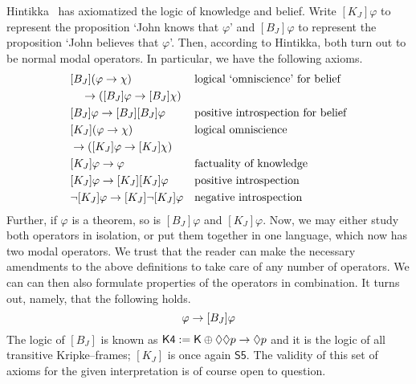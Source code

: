 \index{$[K_J]$, $[B_J]$}%
Hintikka~ has axiomatized the logic
of knowledge and belief. Write $[K_J]\varphi$ to represent
the proposition `John knows that $\varphi$' and $[B_J]\varphi$
to represent the proposition `John believes that $\varphi$'.
Then, according to Hintikka, both turn out to be normal modal
operators. In particular, we have the following axioms.
\begin{align}
& [B_J](\varphi\rightarrow\chi) && \mbox{\rm logical `omniscience' for belief} \\\notag
& \quad \rightarrow ([B_J]\varphi \rightarrow [B_J]\chi) &&  \\
& [B_J]\varphi \rightarrow [B_J][B_J]\varphi && \mbox{\rm positive introspection 
	for belief} \\
& [K_J](\varphi\rightarrow\chi) && \mbox{\rm logical omniscience} \\\notag
& \rightarrow ([K_J]\varphi \rightarrow [K_J]\chi) &&  \\
& [K_J]\varphi \rightarrow \varphi && \mbox{\rm factuality of knowledge} \\
& [K_J]\varphi \rightarrow [K_J][K_J]\varphi &&
    \mbox{\rm positive introspection} \\
& \neg [K_J]\varphi \rightarrow [K_J]\neg [K_J]\varphi &&
    \mbox{\rm negative introspection}
\end{align}
Further, if $\varphi$ is a theorem, so is $[B_J]\varphi$ and
$[K_J]\varphi$. Now, we may either study both operators in
isolation, or put them together in one language, which now has
two modal operators. We trust that the reader can make the
necessary amendments to the above definitions to take care
of any number of operators. We can can then also formulate
properties of the operators in combination. It turns out, namely,
that the following holds.
\begin{equation}
[K_J]\varphi \pf [B_J]\varphi
\end{equation}
The logic of $[B_J]$ is known as $\mathsf{K4} := \mathsf{K}
\oplus \lozenge\lozenge p \rightarrow \lozenge p$ and it is the logic of all transitive
Kripke--frames; $[K_J]$ is once again $\mathsf{S5}$. The validity of 
this set of axioms for the given interpretation is of course open 
to question.

